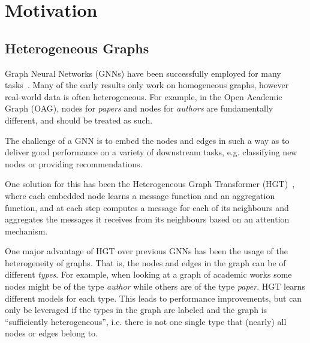 
\section{Motivation} \label{sec:motivation}

\subsection{Heterogeneous Graphs}

Graph Neural Networks (GNNs) have been successfully employed for many tasks~\cite{wang_embeddings_2022}.
Many of the early results only work on homogeneous graphs, however real-world data is often heterogeneous.
For example, in the Open Academic Graph (OAG), nodes for \emph{papers} and nodes for \emph{authors} are fundamentally different,
and should be treated as such.


% 

The challenge of a GNN is to embed the nodes and edges in such a way as to deliver good performance on a variety of downstream tasks, e.g. classifying new nodes or providing recommendations.

One solution for this has been the Heterogeneous Graph Transformer (HGT)~\cite{hu2020heterogeneous}, 
where each embedded node learns a message function and an aggregation function, and at each step computes a message for each of its neighbours and aggregates the messages it receives from its neighbours based on an attention mechanism.

One major advantage of HGT over previous GNNs has been the usage of the heterogeneity of graphs.
That is, the nodes and edges in the graph can be of different \emph{types}.
For example, when looking at a graph of academic works some nodes might be of the type \emph{author} while others are of the type \emph{paper}.
HGT learns different models for each type.
This leads to performance improvements, but can only be leveraged if the types in the graph are labeled and the graph is ``sufficiently heterogeneous'', i.e. there is not one single type that (nearly) all nodes or edges belong to.


